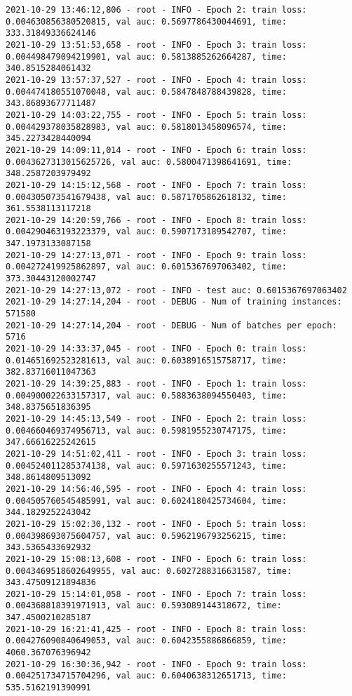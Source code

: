 \documentclass[11pt]{article}
\begin{document}
\begin{verbatim}
2021-10-29 13:46:12,806 - root - INFO - Epoch 2: train loss: 0.004630856380520815, val auc: 0.5697786430044691, time: 333.31849336624146
2021-10-29 13:51:53,658 - root - INFO - Epoch 3: train loss: 0.004498479094219901, val auc: 0.5813885262664287, time: 340.8515284061432
2021-10-29 13:57:37,527 - root - INFO - Epoch 4: train loss: 0.004474180551070048, val auc: 0.5847848788439828, time: 343.86893677711487
2021-10-29 14:03:22,755 - root - INFO - Epoch 5: train loss: 0.004429378035828983, val auc: 0.5818013458096574, time: 345.2273428440094
2021-10-29 14:09:11,014 - root - INFO - Epoch 6: train loss: 0.0043627313015625726, val auc: 0.5800471398641691, time: 348.2587203979492
2021-10-29 14:15:12,568 - root - INFO - Epoch 7: train loss: 0.004305073541679438, val auc: 0.5871705862618132, time: 361.5538113117218
2021-10-29 14:20:59,766 - root - INFO - Epoch 8: train loss: 0.004290463193223379, val auc: 0.5907173189542707, time: 347.1973133087158
2021-10-29 14:27:13,071 - root - INFO - Epoch 9: train loss: 0.004272419925862897, val auc: 0.6015367697063402, time: 373.30443120002747
2021-10-29 14:27:13,072 - root - INFO - test auc: 0.6015367697063402
2021-10-29 14:27:14,204 - root - DEBUG - Num of training instances: 571580
2021-10-29 14:27:14,204 - root - DEBUG - Num of batches per epoch: 5716
2021-10-29 14:33:37,045 - root - INFO - Epoch 0: train loss: 0.014651692523281613, val auc: 0.6038916515758717, time: 382.83716011047363
2021-10-29 14:39:25,883 - root - INFO - Epoch 1: train loss: 0.004900022633157317, val auc: 0.5883638094550403, time: 348.8375651836395
2021-10-29 14:45:13,549 - root - INFO - Epoch 2: train loss: 0.004660469374956713, val auc: 0.5981955230747175, time: 347.66616225242615
2021-10-29 14:51:02,411 - root - INFO - Epoch 3: train loss: 0.004524011285374138, val auc: 0.5971630255571243, time: 348.8614809513092
2021-10-29 14:56:46,595 - root - INFO - Epoch 4: train loss: 0.004505760545485991, val auc: 0.6024180425734604, time: 344.1829252243042
2021-10-29 15:02:30,132 - root - INFO - Epoch 5: train loss: 0.004398693075604757, val auc: 0.5962196793256215, time: 343.5365433692932
2021-10-29 15:08:13,608 - root - INFO - Epoch 6: train loss: 0.0043469518602649955, val auc: 0.6027288316631587, time: 343.47509121894836
2021-10-29 15:14:01,058 - root - INFO - Epoch 7: train loss: 0.004368818391971913, val auc: 0.593089144318672, time: 347.4500210285187
2021-10-29 16:21:41,425 - root - INFO - Epoch 8: train loss: 0.004276090840649053, val auc: 0.6042355886866859, time: 4060.367076396942
2021-10-29 16:30:36,942 - root - INFO - Epoch 9: train loss: 0.004251734715704296, val auc: 0.6040638312651713, time: 535.5162191390991
\end{verbatim}
\end{document}
